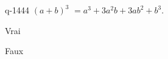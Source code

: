 \begin{truefalse}{q-1444}
$(a+b)^3$ $=a^3+3a^2b+3ab^2+b^3$.
\item* Vrai
\item Faux
\end{truefalse}

